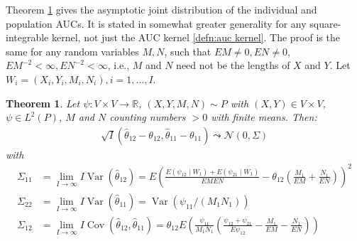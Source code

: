 \documentclass[12pt]{article}
\DeclareMathOperator{\AUC}{AUC}
\DeclareMathOperator{\V}{Var}
\DeclareMathOperator{\cov}{Cov}
\newcommand{\I}{I}
\newcommand{\E}{E}
\renewcommand{\P}{P}
\newcommand{\cind}{\perp \!\!\! \perp}
\newcommand{\aucindiv}{\theta_{11}}%
\newcommand{\aucpop}{\theta_{12}}%
\newcommand{\aucindivhat}{\hat{\theta}_{11}}%
\newcommand{\aucpophat}{\hat{\theta}_{12}}%
\newcommand{\Kernel}{\psi}
\newcommand{\W}[1]{W_{#1}}
\newtheorem{theorem}{Theorem}
\begin{document}
Theorem \ref{theorem:asymptotic} gives the asymptotic joint distribution of the individual and population AUCs. It is stated in somewhat greater generality for any square-integrable kernel, not just the AUC kernel \eqref{defn:auc kernel}. The proof is the same for any random variables $M,N$, such that $\E M\neq 0, \E N\neq 0$, $\E M^{-2}<\infty,\E N^{-2}<\infty$, i.e., $M$ and $N$ need not be the lengths of $X$ and $Y$.  Let $\W{i}=(X_i,Y_i,M_i,N_i),i=1,\ldots,\I.$ 
\begin{theorem}\label{theorem:asymptotic} Let $\psi:V\times V\to\mathbb{R}$, $(X,Y,M,N)\sim\P$ with $(X,Y)\in V\times V$, $\psi\in L^2(\P)$, $M$ and $N$ counting numbers $> 0$ with finite means. Then:
  \begin{align}
    \sqrt{\I}(\aucpophat-\aucpop,\aucindivhat-\aucindiv) \leadsto \mathcal{N}(0,\Sigma)
  \end{align}
  with
  \begin{align}
    \Sigma_{11} &= \lim_{\I\to\infty} \I\V(\aucpophat) =
    \E\left(\frac{\E(\Kernel_{12}\mid\W{1})+\E(\Kernel_{21}\mid\W{1})}{\E M\E N} - \aucpop\left(\frac{M_1}{\E M} + \frac{N_1}{\E N}\right)   \right)^2
    \\
    \Sigma_{22} &= \lim_{\I\to\infty} \I\V(\aucindivhat) =
    \V(\Kernel_{11}/(M_1N_1))
    \\
    \Sigma_{12} &= \lim_{\I\to\infty} \I\cov(\aucpophat,\aucindivhat) =
    \aucpop\E\left(\frac{\Kernel_{11}}{M_1N_1}\left(\frac{\Kernel_{12}+\Kernel_{21}}{\E\Kernel_{12}} - \frac{M_1}{\E M}-\frac{N_1}{\E N}  \right) \right)
  \end{align}
\end{theorem}
\end{document}
